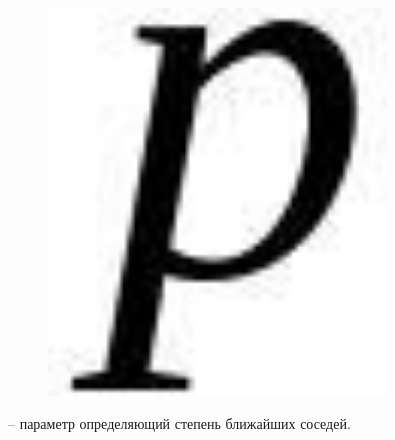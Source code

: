 \begin{figure}[H]
	\centering
	\includegraphics[width=0.8\textwidth]{assets/103}
	\caption*{}
\end{figure} -- параметр определяющий степень
ближайших соседей.

